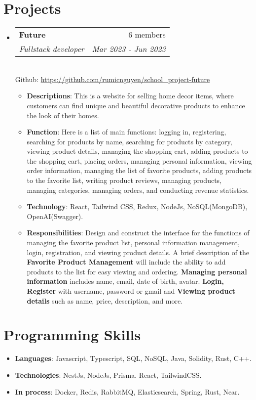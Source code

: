 \documentclass[letterpaper,11pt]{article}
\makeatletter
\newcommand{\resumeItem}[2]{
  \item\small{
    \textbf{#1}{: #2 \vspace{-2pt}}
  }
}
\newcommand{\resumeSubheading}[4]{
  \vspace{-1pt}\item
    \begin{tabular*}{0.97\textwidth}{l@{\extracolsep{\fill}}r}
      \textbf{#1} & #2 \\
      \textit{\small#3} & \textit{\small #4} \\
    \end{tabular*}\vspace{-5pt}
}
\newcommand{\resumeSubItem}[2]{\resumeItem{#1}{#2}\vspace{-4pt}}
\newcommand{\resumeSubHeadingListStart}{\begin{itemize}[leftmargin=*]}
\newcommand{\resumeSubHeadingListEnd}{\end{itemize}}
\newcommand{\resumeItemListStart}{\begin{itemize}}
\newcommand{\resumeItemListEnd}{\end{itemize}\vspace{-5pt}}
\makeatother
\begin{document}



\section{Projects}
\resumeSubHeadingListStart
\resumeSubheading
{Future}{6 members}
{Fullstack developer}{Mar 2023 - Jun 2023}\\
\vspace{2mm}
{Github: \href{https://github.com/rumicnguyen/school_project-future}{https://github.com/rumicnguyen/school\_project-future}}

\vspace{0.5mm}
\resumeItemListStart
\resumeItem{Descriptions}
{This is a website for selling home decor items, where customers can find unique and beautiful decorative products to enhance the look of their homes.}

\resumeItem{Function}
{Here is a list of main functions: logging in, registering, searching for products by name, searching for products by category, viewing product details, managing the shopping cart,
  adding products to the shopping cart, placing orders, managing personal information, viewing order information, managing the list of favorite products, adding products to the favorite list, writing product reviews, managing products, managing categories, managing orders, and conducting revenue statistics.}
\resumeItem{Technology}
{React, Tailwind CSS, Redux, NodeJs, NoSQL(MongoDB), OpenAI(Swagger).}
\resumeItem{Responsibilities}
{Design and construct the interface for the functions of managing the favorite product list, personal information management, login, registration, and viewing product details.
  A brief description of the \textbf{Favorite Product Management} will include the ability to add products to the list for easy viewing and ordering.
  \textbf{Managing personal information} includes name, email, date of birth, avatar.
  \textbf{Login, Register} with username, password or gmail and \textbf{Viewing product details} such as name, price, description, and more.}
\resumeItemListEnd
\resumeSubHeadingListEnd

\section{Programming Skills}
\resumeSubHeadingListStart
\resumeSubItem{Languages}
{Javascript, Typescript, SQL, NoSQL, Java, Solidity, Rust, C++.}

\resumeSubItem{Technologies}
{NestJs, NodeJs, Prisma. React, TailwindCSS.}

\resumeSubItem{In process}
{Docker, Redis, RabbitMQ, Elasticsearch, Spring, Rust, Near.}

\resumeSubHeadingListEnd


\end{document}
